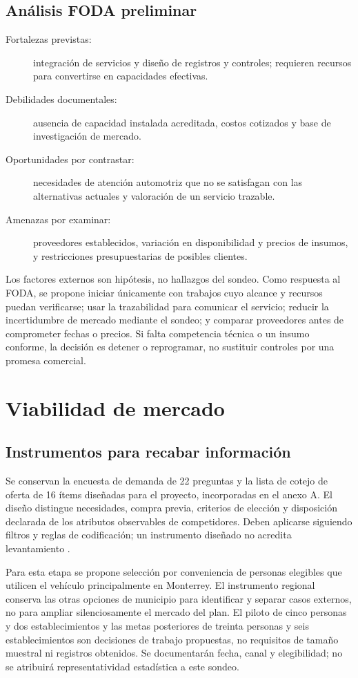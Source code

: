 {\subsection{Análisis FODA preliminar}
\begin{description}
\item[Fortalezas previstas:] integración de servicios y diseño de registros y controles; requieren recursos para convertirse en capacidades efectivas.
\item[Debilidades documentales:] ausencia de capacidad instalada acreditada, costos cotizados y base de investigación de mercado.
\item[Oportunidades por contrastar:] necesidades de atención automotriz que no se satisfagan con las alternativas actuales y valoración de un servicio trazable.
\item[Amenazas por examinar:] proveedores establecidos, variación en disponibilidad y precios de insumos, y restricciones presupuestarias de posibles clientes.
\end{description}
Los factores externos son hipótesis, no hallazgos del sondeo.
Como respuesta al FODA, se propone iniciar únicamente con trabajos cuyo alcance y recursos puedan verificarse; usar la trazabilidad para comunicar el servicio; reducir la incertidumbre de mercado mediante el sondeo; y comparar proveedores antes de comprometer fechas o precios. Si falta competencia técnica o un insumo conforme, la decisión es detener o reprogramar, no sustituir controles por una promesa comercial.
\section{Viabilidad de mercado}
\subsection{Instrumentos para recabar información}
Se conservan la encuesta de demanda de 22 preguntas y la lista de cotejo de oferta de 16 ítems diseñadas para el proyecto, incorporadas en el anexo A. El diseño distingue necesidades, compra previa, criterios de elección y disposición declarada de los atributos observables de competidores. Deben aplicarse siguiendo filtros y reglas de codificación; un instrumento diseñado no acredita levantamiento \citep{albrechtMarketing2023}.

Para esta etapa se propone selección por conveniencia de personas elegibles que utilicen el vehículo principalmente en Monterrey. El instrumento regional conserva las otras opciones de municipio para identificar y separar casos externos, no para ampliar silenciosamente el mercado del plan. El piloto de cinco personas y dos establecimientos y las metas posteriores de treinta personas y seis establecimientos son decisiones de trabajo propuestas, no requisitos de tamaño muestral ni registros obtenidos. Se documentarán fecha, canal y elegibilidad; no se atribuirá representatividad estadística a este sondeo.
}
